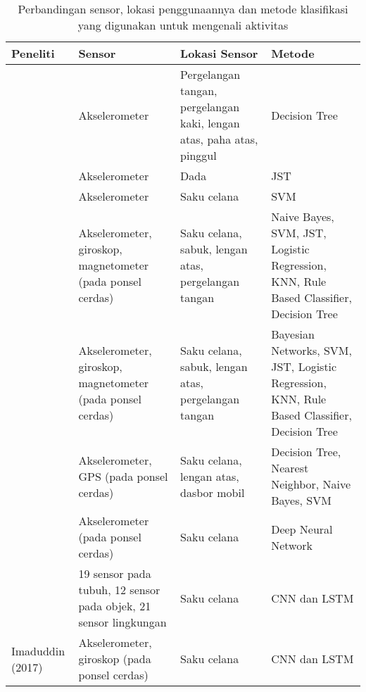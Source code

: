 \begin{table}[p!]
    \centering
    \caption{Perbandingan sensor, lokasi penggunaannya dan metode klasifikasi yang digunakan untuk mengenali aktivitas}
    \begin{tabular}{ |L{2cm}|L{3cm}|L{4.2cm}|L{3cm}| }
        \hline
        \textbf{Peneliti} & \textbf{Sensor} & \textbf{Lokasi Sensor} & \textbf{Metode} \\

        \hline
        \Textcite{tapia-2007} & Akselerometer & Pergelangan tangan, pergelangan kaki, lengan atas, paha atas, pinggul & Decision Tree \\

        \hline
        \Textcite{khan-2010} & Akselerometer & Dada & JST \\

        \hline
        \Textcite{he-2008} & Akselerometer & Saku celana & SVM \\

        \hline
        \Textcite{shoaib-2013} & Akselerometer, giroskop, magnetometer (pada ponsel cerdas) & Saku celana, sabuk, lengan atas, pergelangan tangan & Naive Bayes, SVM, JST, Logistic Regression, KNN, Rule Based Classifier, Decision Tree \\

        \hline
        \Textcite{shoaib-2014} & Akselerometer, giroskop, magnetometer (pada ponsel cerdas) & Saku celana, sabuk, lengan atas, pergelangan tangan & Bayesian Networks, SVM, JST, Logistic Regression, KNN, Rule Based Classifier, Decision Tree \\

        \hline
        \Textcite{Chiang-201413} & Akselerometer, GPS (pada ponsel cerdas) & Saku celana, lengan atas, dasbor mobil & Decision Tree, Nearest Neighbor, Naive Bayes, SVM \\

        \hline
        \Textcite{zhang-2015} & Akselerometer (pada ponsel cerdas) & Saku celana & Deep Neural Network \\

        \hline
        \Textcite{ordonez-2016} & 19 sensor pada tubuh, 12 sensor pada objek, 21 sensor lingkungan & Saku celana & CNN dan LSTM \\

        \hline
        Imaduddin (2017) & Akselerometer, giroskop (pada ponsel cerdas) & Saku celana & CNN dan LSTM \\

        \hline
    \end{tabular}
    \label{table:perbandingan-pustaka}
\end{table}
